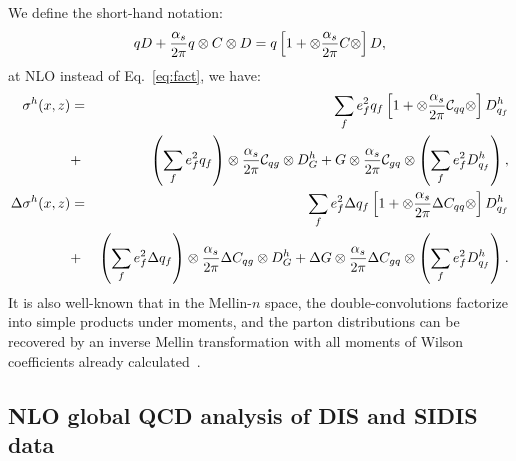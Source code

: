 We define the short-hand notation:
 \begin{eqnarray}
  qD + {\alpha_s \over 2 \pi} q \otimes C \otimes D = 
 q \left[ 1+ \otimes {\alpha_s \over 2 \pi} C \otimes \right] D,
\end{eqnarray}
at NLO instead of Eq.~\ref{eq:fact}, we have:
 \begin{eqnarray}
\label{Eq:nlo1}
\sigma^h(x,z) & = & \sum_{f}  e_f^2 q_f \left[ 1 + \otimes {\alpha_s \over 2 \pi} {\cal C}_{qq} \otimes \right] 
          D_{q_f}^{h}  \nonumber \\ 
& + & \left( \sum_{f}  e_f^2 q_f \right) \otimes {\alpha_s \over 2 \pi} {\cal C}_{qg} \otimes D_G^h
+ G \otimes {\alpha_s \over 2 \pi} {\cal C}_{gq} \otimes \left( \sum_{f} e_f^2 D_{q_f}^{h} \right),  \\
\label{Eq:nlo2}
\Delta \sigma^h(x,z) & = & \sum_{f}  e_f^2 \Delta q_f \left[ 1 + \otimes {\alpha_s \over 2 \pi} \Delta C_{qq} 
 \otimes \right] 
          D_{q_f}^{h}  \nonumber \\ 
& + & \left( \sum_{f}  e_f^2 \Delta q_f \right) \otimes {\alpha_s \over 2 \pi} \Delta C_{qg} \otimes D_G^h
+ \Delta G \otimes {\alpha_s \over 2 \pi} \Delta C_{gq} \otimes \left( \sum_{f} e_f^2 D_{q_f}^{h} \right).
\end{eqnarray}
It is also well-known that in the 
Mellin-$n$ space,
the double-convolutions factorize into simple products under moments, and the parton distributions 
can be recovered by an inverse Mellin transformation with all moments of Wilson
coefficients already calculated~\cite{stratmann2001}. 


\subsection{NLO global QCD analysis of DIS and SIDIS data}


